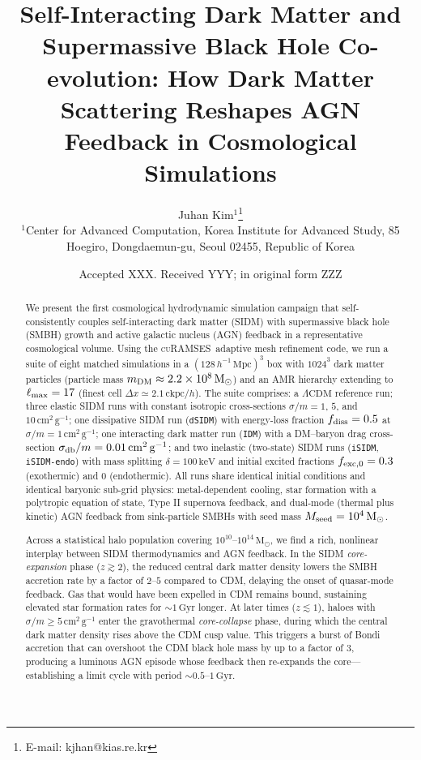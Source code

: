 \documentclass[fleqn,usenatbib]{mnras}
\title[SIDM--AGN Co-evolution]
{Self-Interacting Dark Matter and Supermassive Black Hole Co-evolution:
How Dark Matter Scattering Reshapes AGN Feedback in Cosmological Simulations}
\author[J.~Kim]{
Juhan Kim$^{1}$\thanks{E-mail: kjhan@kias.re.kr}
\\
$^{1}$Center for Advanced Computation, Korea Institute for Advanced Study,
85 Hoegiro, Dongdaemun-gu, Seoul 02455, Republic of Korea
}
\date{Accepted XXX. Received YYY; in original form ZZZ}
\newcommand{\curamses}{\textsc{cuRAMSES}}
\newcommand{\code}[1]{\texttt{#1}}
\newcommand{\sigmam}{\sigma/m}
\newcommand{\Msun}{\mathrm{M_\odot}}
\newcommand{\Mpc}{\,\mathrm{Mpc}}
\newcommand{\Gyr}{\,\mathrm{Gyr}}
\newcommand{\LCDM}{\Lambda\mathrm{CDM}}
\begin{document}
\label{firstpage}
\pagerange{\pageref{firstpage}--\pageref{lastpage}}

\maketitle

\begin{abstract}
We present the first cosmological hydrodynamic simulation campaign
that self-consistently couples self-interacting dark matter (SIDM)
with supermassive black hole (SMBH) growth and active galactic
nucleus (AGN) feedback in a representative cosmological volume.
Using the \curamses\ adaptive mesh refinement code, we run a suite
of eight matched simulations in a $(128\,h^{-1}\Mpc)^3$ box with
$1024^3$ dark matter particles (particle mass $m_{\rm DM} \approx
2.2\times 10^{8}\,\Msun$) and an AMR hierarchy extending to
$\ell_{\rm max}=17$ (finest cell $\Delta x \simeq 2.1\,\mathrm{ckpc}/h$).
The suite comprises: a $\LCDM$ reference run; three elastic SIDM
runs with constant isotropic cross-sections $\sigmam =
1$, $5$, and $10\,\mathrm{cm^2\,g^{-1}}$; one dissipative SIDM run
(\code{dSIDM}) with energy-loss fraction $f_{\rm diss}=0.5$ at
$\sigmam = 1\,\mathrm{cm^2\,g^{-1}}$; one interacting dark matter
run (\code{IDM}) with a DM--baryon drag cross-section
$\sigma_{\rm db}/m = 0.01\,\mathrm{cm^2\,g^{-1}}$; and two inelastic
(two-state) SIDM runs (\code{iSIDM}, \code{iSIDM-endo}) with mass
splitting $\delta = 100\,\mathrm{keV}$ and initial excited fractions
$f_{\rm exc,0} = 0.3$ (exothermic) and $0$ (endothermic).  All runs
share identical initial conditions and identical baryonic sub-grid
physics: metal-dependent cooling, star formation with a polytropic
equation of state, Type II supernova feedback, and dual-mode
(thermal plus kinetic) AGN feedback from sink-particle SMBHs with
seed mass $M_{\rm seed}=10^{4}\,\Msun$.

Across a statistical halo population covering
$10^{10}$--$10^{14}\,\Msun$, we find a rich, nonlinear interplay
between SIDM thermodynamics and AGN feedback.  In the SIDM
\emph{core-expansion} phase ($z \gtrsim 2$), the reduced central
dark matter density lowers the SMBH accretion rate by a factor of
$2$--$5$ compared to CDM, delaying the onset of quasar-mode
feedback.  Gas that would have been expelled in CDM remains bound,
sustaining elevated star formation rates for $\sim 1\Gyr$ longer.
At later times ($z \lesssim 1$), haloes with $\sigmam \ge
5\,\mathrm{cm^2\,g^{-1}}$ enter the gravothermal
\emph{core-collapse} phase, during which the central dark matter
density rises above the CDM cusp value.  This triggers a burst of
Bondi accretion that can overshoot the CDM black hole mass by up to
a factor of $3$, producing a luminous AGN episode whose feedback
then re-expands the core---establishing a limit cycle with period
$\sim 0.5$--$1\Gyr$.


\end{abstract}
\end{document}
